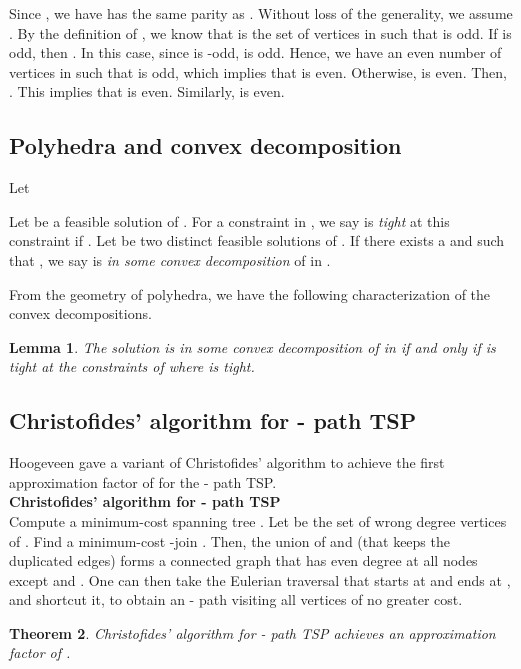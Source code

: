 \documentclass[11pt]{article}
\newcommand{\qed}{\hspace*{\fill}}
\newtheorem{theorem}{Theorem}[section]
\newtheorem{lemma}[theorem]{Lemma}
\newenvironment{proof}[1][Proof. ]{\noindent {\bf #1 }}{\qed}
\begin{document}
\vspace{3mm}

\begin{proof}
Since , we have  has the same parity as . Without loss of the generality, we assume . By the definition of , we know that  is the set of vertices  in  such that  is odd. If  is odd, then . In this case, since  is -odd,  is odd.  Hence, we have an even number of vertices  in  such that  is odd, which implies that  is even. Otherwise,  is even. Then, . This implies that  is even. Similarly,  is even.
\end{proof}


\subsection{Polyhedra and convex decomposition}

Let

Let  be a feasible solution of . For a constraint  in , we say  is \emph{tight} at this constraint if . Let  be two distinct feasible solutions of . If there exists a  and 
such that , we say
 is \emph{in some convex decomposition} of  in .

From the geometry of polyhedra, we have the following characterization of the convex
decompositions.

\begin{lemma}\label{lem:decomposition}
The solution  is in some convex decomposition of  in  if and only if  is tight at the constraints of  where  is tight.
\end{lemma}

\subsection{Christofides' algorithm for - path TSP}
Hoogeveen \cite{hoogeveen91} gave a variant of Christofides' algorithm to achieve the first approximation
factor of  for the - path TSP.\\

\noindent \textbf{Christofides' algorithm for - path TSP}\\
\noindent Compute a minimum-cost spanning tree . Let  be the set of wrong degree vertices of .
Find a minimum-cost -join . Then, the union  of  and  (that keeps the duplicated edges) forms a
connected graph that has even degree at all nodes except  and . One can then take the Eulerian traversal that starts
at  and ends at , and shortcut it, to obtain
an - path visiting all vertices of no greater cost.
\begin{theorem}\cite{hoogeveen91}
Christofides' algorithm for - path TSP achieves an approximation factor of .
\end{theorem}
\end{document}
